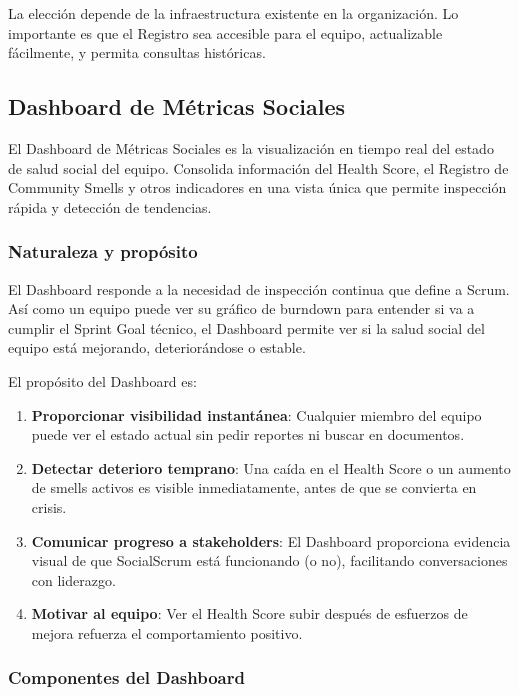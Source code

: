 La elección depende de la infraestructura existente en la organización. Lo importante es que el Registro sea accesible para el equipo, actualizable fácilmente, y permita consultas históricas.

\subsection{Dashboard de Métricas Sociales}

El Dashboard de Métricas Sociales es la visualización en tiempo real del estado de salud social del equipo. Consolida información del Health Score, el Registro de Community Smells y otros indicadores en una vista única que permite inspección rápida y detección de tendencias.

\subsubsection{Naturaleza y propósito}

El Dashboard responde a la necesidad de inspección continua que define a Scrum. Así como un equipo puede ver su gráfico de burndown para entender si va a cumplir el Sprint Goal técnico, el Dashboard permite ver si la salud social del equipo está mejorando, deteriorándose o estable.

El propósito del Dashboard es:

\begin{enumerate}
    \item \textbf{Proporcionar visibilidad instantánea}: Cualquier miembro del equipo puede ver el estado actual sin pedir reportes ni buscar en documentos.

    \item \textbf{Detectar deterioro temprano}: Una caída en el Health Score o un aumento de smells activos es visible inmediatamente, antes de que se convierta en crisis.

    \item \textbf{Comunicar progreso a stakeholders}: El Dashboard proporciona evidencia visual de que SocialScrum está funcionando (o no), facilitando conversaciones con liderazgo.

    \item \textbf{Motivar al equipo}: Ver el Health Score subir después de esfuerzos de mejora refuerza el comportamiento positivo.
\end{enumerate}

\subsubsection{Componentes del Dashboard}

